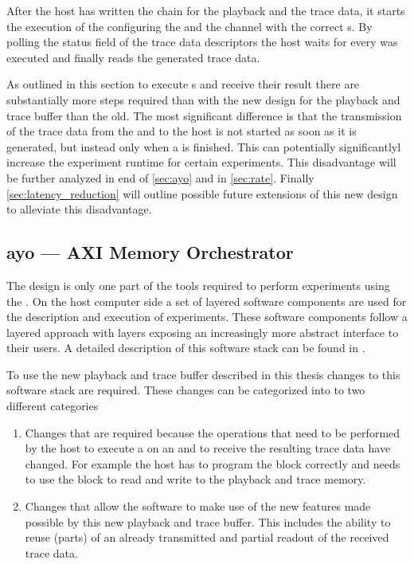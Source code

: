 After the host has written the \descriptor{} chain for the playback and the trace data, it starts the execution of the \PlaybackProgram{} configuring the \SToMM{} and the \MMToS{} channel with the correct \descriptor{}s.
By polling the status field of the trace data descriptors the host waits for every \PlaybackProgram{} was executed and finally reads the generated trace data.

As outlined in this section to execute \PlaybackProgram{}s and receive their result there are substantially more steps required than with the new design for the playback and trace buffer than the old. The most significant difference is that the transmission of the trace data from the \FPGA{} and to the host is not started as soon as it is generated, but instead only when a \PlaybackProgram{} is finished. This can potentially significantlyl increase the experiment runtime for certain experiments. This disadvantage will be further analyzed in end of \autoref{sec:ayo} and in \autoref{sec:rate}. Finally \autoref{sec:latency_reduction} will outline possible future extensions of this new design to alleviate this disadvantage.
\subsection{ayo --- AXI Memory Orchestrator}\label{sec:ayo}
The \FPGA{} design is only one part of the tools required to perform experiments using the \HICANNX{} \ASIC{}. On the host computer side a set of layered software components are used for the description and execution of experiments. These software components follow a layered approach with layers exposing an increasingly more abstract interface to their users. A detailed description of this software stack can be found in \autocite{mueller2022scalable}.

To use the new playback and trace buffer described in this thesis changes to this software stack are required. These changes can be categorized into to two different categories
\begin{enumerate}
\item Changes that are required because the operations that need to be performed by the host to execute a \PlaybackProgram{} on  an \FPGA{} and to receive the resulting trace data have changed. For example the host has to program the \AXIDMA{} block correctly and needs to use the \FAXI{} block to read and write to the playback and trace memory.
\item Changes that allow the software to make use of the new features made possible by this new playback and trace buffer. This includes the ability to reuse (parts) of an already transmitted \PlaybackProgram{} and partial readout of the received trace data.
\end{enumerate}

